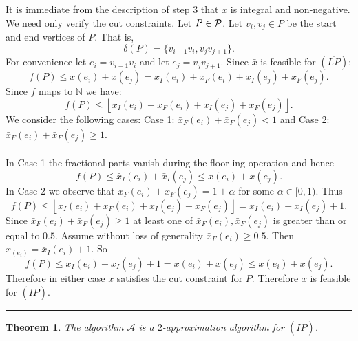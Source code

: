 \documentclass[letterpaper,12pt,oneside,onecolumn]{article}
\newcommand{\N}{\mathbb{N}} \newcommand{\R}{\mathbb{R}}
\newcommand{\cA}{\mathcal{A}} \newcommand{\cB}{\mathcal{B}}
\newenvironment{proof}{{\bf Proof:  }}{\hfill\rule{2mm}{2mm}}
\newtheorem{theorem}[fact]{Theorem}
\newcommand{\floor}[1]{\ensuremath{\left\lfloor#1\right\rfloor}}
\begin{document}
\begin{proof}
It is immediate from the description of step $3$ that $x$ is integral and non-negative. We need only verify the cut constraints. Let $P \in \mathcal{P}$. Let $v_i, v_j \in P$ be the start and end vertices of $P$. That is,
$$\delta(P) = \{v_{i-1}v_i,  v_jv_{j+1}\}.$$
For convenience let $e_i = v_{i-1}v_i$ and let $e_j = v_jv_{j+1}$. Since $\bar{x}$ is feasible for $(\overline{LP})$:
$$ f(P)\leq \bar{x}(e_i) + \bar{x}(e_j) = \bar{x}_I(e_i) + \bar{x}_F(e_i)  + \bar{x}_I(e_j) + \bar{x}_F(e_j).$$
Since $f$ maps to $\N$ we have:
$$f(P) \leq \floor{\bar{x}_I(e_i) + \bar{x}_F(e_i)  + \bar{x}_I(e_j) + \bar{x}_F(e_j)}.$$
We consider the following cases: Case 1: $\bar{x}_F(e_i) + \bar{x}_F(e_j) < 1$ and Case 2: $\bar{x}_F(e_i) + \bar{x}_F(e_j) \geq 1$.
\paragraph{}
In Case 1 the fractional parts vanish during the floor-ing operation and hence
$$ f(P) \leq \bar{x}_I(e_i) + \bar{x}_I(e_j)  \leq x(e_i) + x(e_j).$$
In Case 2 we observe that $x_F(e_i) + x_F(e_j) = 1 + \alpha$ for some $\alpha \in [0,1)$. Thus
$$f(P) \leq \floor{\bar{x}_I(e_i) + \bar{x}_F(e_i)  + \bar{x}_I(e_j) + \bar{x}_F(e_j)} = \bar{x}_I(e_i) + \bar{x}_I(e_j)  + 1.$$
Since $\bar{x}_F(e_i) + \bar{x}_F(e_j) \geq 1$ at least one of $\bar{x}_F(e_i) ,\bar{x}_F(e_j) $ is greater than or equal to $0.5$. Assume without loss of generality $\bar{x}_F(e_i) \geq 0.5$. Then $x_(e_i) = \bar{x}_I(e_i) + 1$. So
$$f(P) \leq \bar{x}_I(e_i) + \bar{x}_I(e_j)  + 1 = x(e_i) +\bar{x}(e_j) \leq x(e_i) + x(e_j).$$
Therefore in either case $x$ satisfies the cut constraint for $P$. Therefore $x$ is feasible for $(\overline{IP})$.
\end{proof}
\begin{theorem}
The algorithm $\cA$ is a $2$-approximation algorithm for $(\overline{IP})$.
\end{theorem}
\end{document}
